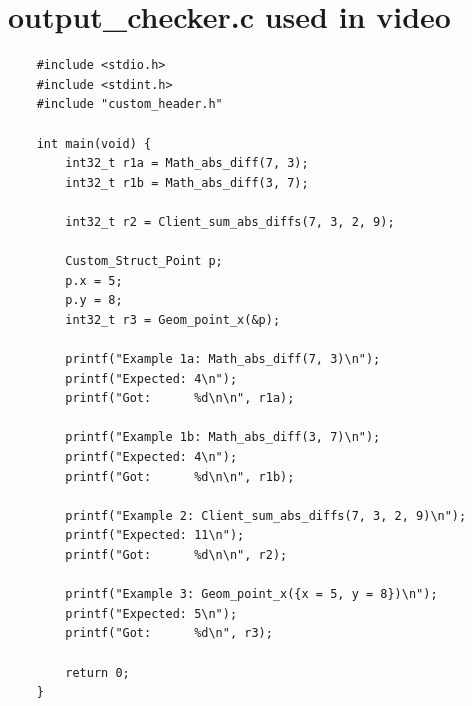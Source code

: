 \documentclass[11pt,a4paper,oneside]{report}
\begin{document}
		\chapter{output\_checker.c used in video}
	
	\begin{lstlisting}
	#include <stdio.h>
	#include <stdint.h>
	#include "custom_header.h"
	
	int main(void) {
		int32_t r1a = Math_abs_diff(7, 3);
		int32_t r1b = Math_abs_diff(3, 7);
		
		int32_t r2 = Client_sum_abs_diffs(7, 3, 2, 9);
		
		Custom_Struct_Point p;
		p.x = 5;
		p.y = 8;
		int32_t r3 = Geom_point_x(&p);
		
		printf("Example 1a: Math_abs_diff(7, 3)\n");
		printf("Expected: 4\n");
		printf("Got:      %d\n\n", r1a);
		
		printf("Example 1b: Math_abs_diff(3, 7)\n");
		printf("Expected: 4\n");
		printf("Got:      %d\n\n", r1b);
		
		printf("Example 2: Client_sum_abs_diffs(7, 3, 2, 9)\n");
		printf("Expected: 11\n");
		printf("Got:      %d\n\n", r2);
		
		printf("Example 3: Geom_point_x({x = 5, y = 8})\n");
		printf("Expected: 5\n");
		printf("Got:      %d\n", r3);
		
		return 0;
	}
		
	\end{lstlisting}
	
\end{document}

